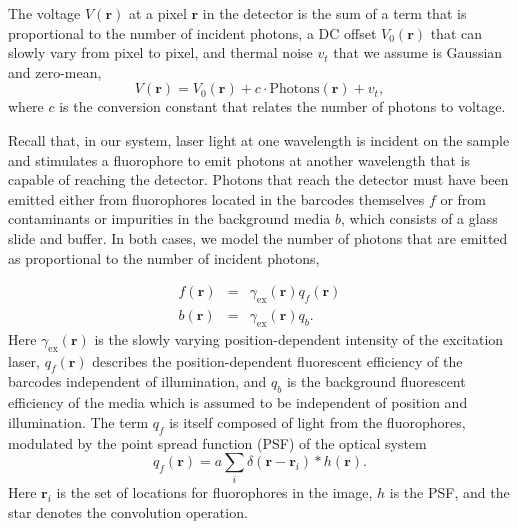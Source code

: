 The voltage $V(\mathbf{r})$ at a pixel $\mathbf{r}$ in the detector is the sum of a term that is proportional to the number of incident photons, a DC offset $V_0(\mathbf{r})$ that can slowly vary from pixel to pixel, and thermal noise $v_t$ that we assume is Gaussian and zero-mean,
\begin{equation}
V(\mathbf{r})=V_0(\mathbf{r})+c \cdot \text{Photons}(\mathbf{r}) +v_t,
\end{equation}
where $c$ is the conversion constant that relates the number of photons to voltage. 


Recall that, in our system, laser light at one wavelength is incident on the sample and stimulates a fluorophore to emit photons at another wavelength that is capable of reaching the detector. Photons that reach the detector must have been emitted either from fluorophores located  in the barcodes themselves $f$ or from contaminants or impurities in the background media $b$, which consists of a glass slide and buffer.  In both cases, we model the number of photons that are emitted as proportional to the number of incident photons, 


\begin{eqnarray}
f(\mathbf{r})&=&\gamma_{\text{ex}}(\mathbf{r}) q_f(\mathbf{r})\\
b(\mathbf{r})&=&\gamma_{\text{ex}}(\mathbf{r}) q_b.
\end{eqnarray}
Here $\gamma_{\text{ex}}(\mathbf{r})$ is the slowly varying position-dependent intensity of the excitation laser,  $q_f(\mathbf{r})$ describes the position-dependent fluorescent efficiency of the barcodes independent of illumination, and $q_b$ is the background fluorescent efficiency of the media which is assumed to be independent of position and illumination. The term $q_f$ is itself composed of light from the fluorophores, modulated by the point spread function (PSF) of the optical system
\begin{equation}
q_f(\mathbf{r})=a \sum_i\delta(\mathbf{r}-\mathbf{r}_i) * h(\mathbf{r}).
\end{equation}
Here $\mathbf{r}_i$ is the set of locations for fluorophores in the image, $h$ is the PSF, and the star denotes the convolution operation.

